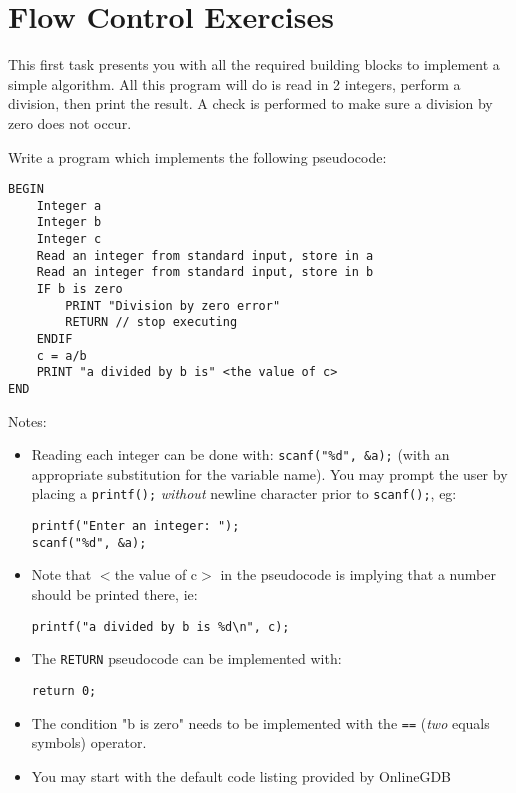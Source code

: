 \documentclass{lab}
\begin{document}
\pagebreak
\section{Flow Control Exercises}

This first task presents you with all the required building blocks to implement a simple algorithm. All this program will do is read in 2 integers, perform a division, then print the result. A check is performed to make sure a division by zero does not occur.

\begin{task}{}{}
Write a program which implements the following pseudocode:

\begin{lstlisting}[style=pseudo]
BEGIN 
	Integer a 
	Integer b
	Integer c
	Read an integer from standard input, store in a
	Read an integer from standard input, store in b
	IF b is zero
		PRINT "Division by zero error"
		RETURN // stop executing
	ENDIF
	c = a/b
	PRINT "a divided by b is" <the value of c>
END
\end{lstlisting}

Notes:

\begin{itemize}
\item Reading each integer can be done with: \texttt{scanf("\%d", \&a);} (with an appropriate substitution for the variable name). You may prompt the user by placing a \texttt{printf();} \textit{without} newline character prior to \texttt{scanf();}, eg:

\begin{lstlisting}[style=CStyle]
printf("Enter an integer: ");
scanf("%d", &a);
\end{lstlisting}

\item Note that $<$the value of c$>$ in the pseudocode is implying that a number should be printed there, ie:

\begin{lstlisting}[style=CStyle]
printf("a divided by b is %d\n", c);
\end{lstlisting}


\item The \texttt{RETURN} pseudocode can be implemented with:
\begin{lstlisting}[style=CStyle]
return 0;
\end{lstlisting}

\item The condition "b is zero" needs to be implemented with the \texttt{==} (\textit{two} equals symbols) operator.

\item You may start with the default code listing provided by OnlineGDB
\end{itemize}
\end{task}
\end{document}
